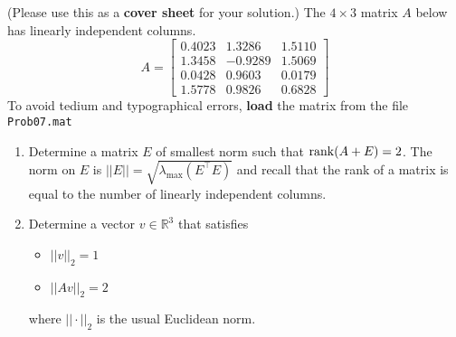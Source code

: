 \documentclass[letterpaper]{article}
\newcommand{\real}{\mathbb R}  %
\begin{document}
\newpage

  (Please use this as a \textbf{cover sheet} for your solution.) The $4 \times 3$ matrix $A$ below has linearly independent columns.
$$A = \left[ \begin{array}{rrr}0.4023& 1.3286& 1.5110\\1.3458& -0.9289& 1.5069\\0.0428& 0.9603& 0.0179\\1.5778& 0.9826& 0.6828\end{array} \right]
$$
To avoid tedium and typographical errors, \textbf{load} the matrix from the file \texttt{Prob07.mat}


    \begin{enumerate}
\setlength{\itemsep}{1cm}
\renewcommand{\labelenumi}{(\alph{enumi})}

 \item Determine a matrix $E$ of smallest norm such that ${\rm rank}(A+E)=2$. The norm on $E$ is
 $||E|| = \sqrt{ \lambda_{\max} (E^\top E)}$ and recall that the rank of a matrix is equal to the number of linearly independent columns.\\


 \item Determine a vector $v \in \real^3$ that satisfies
 \begin{itemize}
 \item $||v||_2 = 1$
 \item $||A v||_2 = 2$
 \end{itemize}
 where $||\cdot||_2$ is the usual Euclidean norm.



\end{enumerate}
\end{document}
